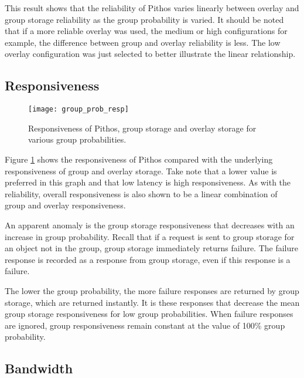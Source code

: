 This result shows that the reliability of Pithos varies linearly between overlay and group storage reliability as the group probability is varied. It should be noted that if a more reliable overlay was used, the medium or high configurations for example, the difference between group and overlay reliability is less. The low overlay configuration was just selected to better illustrate the linear relationship.

\subsection{Responsiveness}

\begin{figure}[htbp]
 \centering
 \texttt{[image: group\_prob\_resp]}
 \caption{Responsiveness of Pithos, group storage and overlay storage for various group probabilities.}
 \label{fig_group_prob_resp}
\end{figure}
%
Figure \ref{fig_group_prob_resp} shows the responsiveness of Pithos compared with the underlying responsiveness of group and overlay storage. Take note that a lower value is preferred in this graph and that low latency is high responsiveness. As with the reliability, overall responsiveness is also shown to be a linear combination of group and overlay responsiveness.

An apparent anomaly is the group storage responsiveness that decreases with an increase in group probability. Recall that if a request is sent to group storage for an object not in the group, group storage immediately returns failure. The failure response is recorded as a response from group storage, even if this response is a failure.

The lower the group probability, the more failure responses are returned by group storage, which are returned instantly. It is these responses that decrease the mean group storage responsiveness for low group probabilities. When failure responses are ignored, group responsiveness remain constant at the value of 100\% group probability.

\subsection{Bandwidth}


